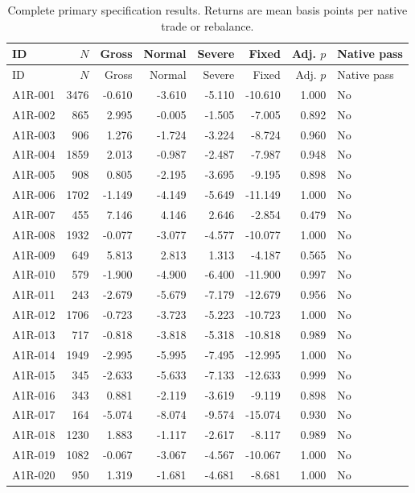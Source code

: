 \begingroup\scriptsize\setlength{\tabcolsep}{2.5pt}
\begin{longtable}{lrrrrrrl}
\caption{Complete primary specification results. Returns are mean basis points per native trade or rebalance.}\label{tab:s_specs}\\
\toprule ID & $N$ & Gross & Normal & Severe & Fixed & Adj. $p$ & Native pass \\
\midrule\endfirsthead
\toprule ID & $N$ & Gross & Normal & Severe & Fixed & Adj. $p$ & Native pass \\
\midrule\endhead
A1R-001 & 3476 & -0.610 & -3.610 & -5.110 & -10.610 & 1.000 & No \\
A1R-002 & 865 & 2.995 & -0.005 & -1.505 & -7.005 & 0.892 & No \\
A1R-003 & 906 & 1.276 & -1.724 & -3.224 & -8.724 & 0.960 & No \\
A1R-004 & 1859 & 2.013 & -0.987 & -2.487 & -7.987 & 0.948 & No \\
A1R-005 & 908 & 0.805 & -2.195 & -3.695 & -9.195 & 0.898 & No \\
A1R-006 & 1702 & -1.149 & -4.149 & -5.649 & -11.149 & 1.000 & No \\
A1R-007 & 455 & 7.146 & 4.146 & 2.646 & -2.854 & 0.479 & No \\
A1R-008 & 1932 & -0.077 & -3.077 & -4.577 & -10.077 & 1.000 & No \\
A1R-009 & 649 & 5.813 & 2.813 & 1.313 & -4.187 & 0.565 & No \\
A1R-010 & 579 & -1.900 & -4.900 & -6.400 & -11.900 & 0.997 & No \\
A1R-011 & 243 & -2.679 & -5.679 & -7.179 & -12.679 & 0.956 & No \\
A1R-012 & 1706 & -0.723 & -3.723 & -5.223 & -10.723 & 1.000 & No \\
A1R-013 & 717 & -0.818 & -3.818 & -5.318 & -10.818 & 0.989 & No \\
A1R-014 & 1949 & -2.995 & -5.995 & -7.495 & -12.995 & 1.000 & No \\
A1R-015 & 345 & -2.633 & -5.633 & -7.133 & -12.633 & 0.999 & No \\
A1R-016 & 343 & 0.881 & -2.119 & -3.619 & -9.119 & 0.898 & No \\
A1R-017 & 164 & -5.074 & -8.074 & -9.574 & -15.074 & 0.930 & No \\
A1R-018 & 1230 & 1.883 & -1.117 & -2.617 & -8.117 & 0.989 & No \\
A1R-019 & 1082 & -0.067 & -3.067 & -4.567 & -10.067 & 1.000 & No \\
A1R-020 & 950 & 1.319 & -1.681 & -4.681 & -8.681 & 1.000 & No \\

\end{longtable}
